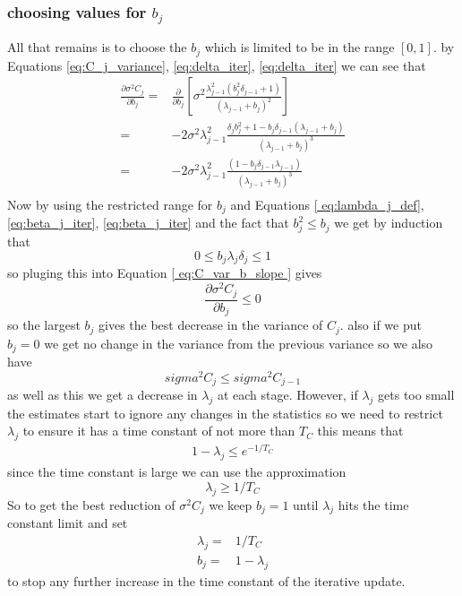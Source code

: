 \documentclass[a4paper,oneside,english]{book}
\numberwithin{equation}{section}
\numberwithin{figure}{section}
\begin{document}
\subsubsection{choosing values for $b_j$}
All that remains is to choose  the $b_j$ which is limited to be in the range $[0, 1]$.  by Equations \ref{eq:C_j_variance}, \ref{eq:delta_iter}, \ref{eq:delta_iter} we can see that 
\begin{align}
\frac{\partial \sigma^2 C_j}{\partial b_j}=& \frac{\partial}{\partial b_j} \left[\sigma^2\frac{\lambda_{j-1}^2(b_j^2 \delta_{j-1}+1) }{(\lambda_{j-1}+b_j )^2} \right]\\
=&-2\sigma^2\lambda_{j-1}^2\frac{\delta_j b_j^2 +1  -b_j \delta_{j-1}(\lambda_{j-1}+b_j)}{(\lambda_{j-1} + b_j)^3} \\
=& -2\sigma^2\lambda_{j-1}^2\frac{(1  -b_j \delta_{j-1}\lambda_{j-1})}{(\lambda_{j-1} + b_j)^3} \label{ eq:C_var_b_slope   } \\
\end{align}
Now by using the restricted range for $b_j$ and Equations \ref{ eq:lambda_j_def}, \ref{eq:beta_j_iter}, \ref{eq:beta_j_iter} and the fact that $b_j^2\le b_j$ we get by induction that
\begin{equation}
0 \le b_j \lambda_j \delta_j \le 1
\end{equation}
so pluging this into Equation \ref{ eq:C_var_b_slope   } gives 
\begin{equation}
\frac{\partial \sigma^2 C_j}{\partial b_j} \le 0
\end{equation}
so the largest $b_j$ gives the best decrease in the variance of  $C_j$. also if we put $b_j = 0$ we get no change in the variance  from the previous variance so we also have
\begin{equation}
sigma^2 C_j\le sigma^2 C_{j-1}
\end{equation}
as well as this we get a decrease in $\lambda_j$ at each stage. However, if  $\lambda_j$ gets too small  the estimates start to ignore any changes in the statistics so we need to restrict $\lambda_j$ to ensure it has a time constant of not more than $T_C $ this means that
\begin{align}
1-\lambda_j \le e^{-1/T_C}
\end{align}  
since  the time constant is large we can use the approximation 
\begin{equation}
\lambda_j \ge 1/T_C
\end{equation}
So to get the best reduction of  $\sigma^2 C_j$ we keep $b_j = 1$ until  $\lambda_j$ hits the time constant limit and set
\begin{align}
\lambda_j =& 1/T_C \\
b_j =& 1-\lambda_j
\end{align}
to stop any further increase in the time constant of the iterative update.
\end{document}

